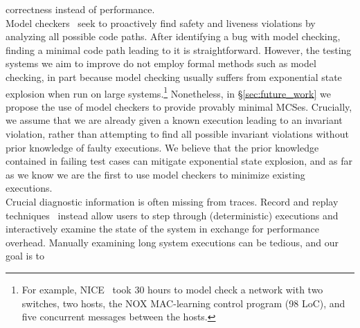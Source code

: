 correctness instead of performance.\\[0.5ex]
%
Model checkers~\cite{musuvathi2008finding,nice} seek to
proactively find safety and liveness violations by analyzing all possible code paths.
After identifying a bug with model checking, finding a minimal code path leading to it is
straightforward. However, the testing systems we aim to improve do not employ
formal methods such as model checking, in part because model checking usually suffers from exponential
state explosion when run on large systems.\footnote{For example, NICE~\cite{nice} took 30 hours to
model check a network with two switches, two hosts, the NOX MAC-learning
control program (98 LoC), and five concurrent
messages between the hosts.} Nonetheless, in \S\ref{sec:future_work} we propose the
use of model checkers to provide provably
minimal MCSes. Crucially, we assume that we are already given a known
execution leading to an invariant violation, rather than attempting to find all
possible invariant violations without prior knowledge of faulty executions. We
believe that the prior knowledge contained in failing test cases can mitigate exponential
state explosion, and as far as we know we are the first to use model checkers
to minimize existing executions.\\[0.5ex]
%
 Crucial diagnostic information is often missing from traces.
Record and replay
techniques~\cite{Geels:2006:RDD:1267359.1267386,lin2013defined,Zamfir:2010:EST:1755913.1755946,Yuan:2010:SED:1736020.1736038}
instead allow users to step through (deterministic) executions and interactively examine the
state of the system in exchange for performance overhead.
Manually examining long system executions can be tedious, and our goal is to
